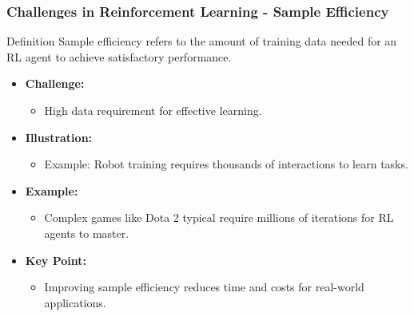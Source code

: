\documentclass[aspectratio=169]{beamer}
\begin{document}
\begin{frame}[fragile]
    \frametitle{Challenges in Reinforcement Learning - Sample Efficiency}
    \begin{block}{Definition}
        Sample efficiency refers to the amount of training data needed for an RL agent to achieve satisfactory performance.
    \end{block}
    \begin{itemize}
        \item \textbf{Challenge:}
        \begin{itemize}
            \item High data requirement for effective learning.
        \end{itemize}
        \item \textbf{Illustration:} 
        \begin{itemize}
            \item Example: Robot training requires thousands of interactions to learn tasks.
        \end{itemize}
        \item \textbf{Example:}
        \begin{itemize}
            \item Complex games like Dota 2 typical require millions of iterations for RL agents to master.
        \end{itemize}
        \item \textbf{Key Point:} 
        \begin{itemize}
            \item Improving sample efficiency reduces time and costs for real-world applications.
        \end{itemize}
    \end{itemize}
\end{frame}
\end{document}
